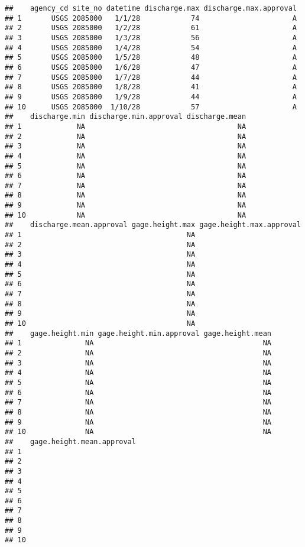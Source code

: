 \documentclass[]{article}
\begin{document}
\begin{verbatim}
##    agency_cd site_no datetime discharge.max discharge.max.approval
## 1       USGS 2085000   1/1/28            74                      A
## 2       USGS 2085000   1/2/28            61                      A
## 3       USGS 2085000   1/3/28            56                      A
## 4       USGS 2085000   1/4/28            54                      A
## 5       USGS 2085000   1/5/28            48                      A
## 6       USGS 2085000   1/6/28            47                      A
## 7       USGS 2085000   1/7/28            44                      A
## 8       USGS 2085000   1/8/28            41                      A
## 9       USGS 2085000   1/9/28            44                      A
## 10      USGS 2085000  1/10/28            57                      A
##    discharge.min discharge.min.approval discharge.mean
## 1             NA                                    NA
## 2             NA                                    NA
## 3             NA                                    NA
## 4             NA                                    NA
## 5             NA                                    NA
## 6             NA                                    NA
## 7             NA                                    NA
## 8             NA                                    NA
## 9             NA                                    NA
## 10            NA                                    NA
##    discharge.mean.approval gage.height.max gage.height.max.approval
## 1                                       NA                         
## 2                                       NA                         
## 3                                       NA                         
## 4                                       NA                         
## 5                                       NA                         
## 6                                       NA                         
## 7                                       NA                         
## 8                                       NA                         
## 9                                       NA                         
## 10                                      NA                         
##    gage.height.min gage.height.min.approval gage.height.mean
## 1               NA                                        NA
## 2               NA                                        NA
## 3               NA                                        NA
## 4               NA                                        NA
## 5               NA                                        NA
## 6               NA                                        NA
## 7               NA                                        NA
## 8               NA                                        NA
## 9               NA                                        NA
## 10              NA                                        NA
##    gage.height.mean.approval
## 1                           
## 2                           
## 3                           
## 4                           
## 5                           
## 6                           
## 7                           
## 8                           
## 9                           
## 10
\end{verbatim}
\end{document}
